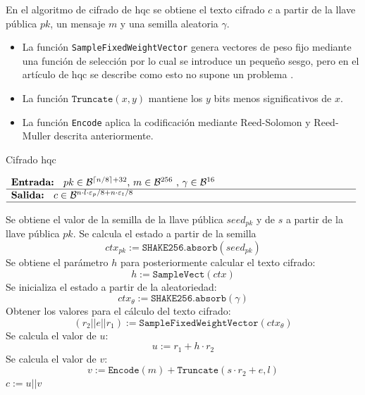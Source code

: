 En el algoritmo de cifrado de \acrshort{hqc} se obtiene el texto cifrado \(c\) a partir de la llave pública \(pk\), un mensaje \(m\) y una semilla aleatoria \(\gamma\).
\begin{itemize}
	\item La función \texttt{SampleFixedWeightVector} genera vectores de peso fijo mediante una función de selección por lo cual se introduce un pequeño sesgo, pero en el artículo de \acrshort{hqc} se describe como esto no supone un problema \cite{hqc2025}.
	\item La función $\texttt{Truncate}(x,y)$ mantiene los \(y\) bits menos significativos de \(x\).
	\item La función \texttt{Encode} aplica la codificación mediante Reed-Solomon y Reed-Muller descrita anteriormente.
\end{itemize}
\newpage
\begin{algorithm}[H]
	\small
	\caption{Cifrado \acrshort{hqc}}
	$\begin{array}{p{\textwidth}}
		\textbf{Entrada: } \(pk\in \mathcal{B}^{\lceil n/8 \rceil+32}\), \(m\in \mathcal{B}^{256}\) , \(\gamma\in \mathcal{B}^{16}\)\\ 
		\hline
		\textbf{Salida: } \(c\in \mathcal{B}^{n\cdot l\cdot \varepsilon_p/8+n\cdot \varepsilon_t/8}\)\\ 
		\hline
	\end{array}$
	\begin{algorithmic}[1]
		\State Se obtiene el valor de la semilla de la llave pública \(seed_{pk}\) y de \(s\) a partir de la llave pública \(pk\).
		\State Se calcula el estado a partir de la semilla
		\begin{equation}
			ctx_{pk}:=\texttt{SHAKE256.absorb}(seed_{pk})
		\end{equation}
		\State Se obtiene el parámetro \(h\) para posteriormente calcular el texto cifrado:
		\begin{equation}
			h:=\texttt{SampleVect}(ctx)
		\end{equation}
		\State Se inicializa el estado a partir de la aleatoriedad:
		\begin{equation}
			ctx_{\theta}:=\texttt{SHAKE256.absorb}(\gamma)
		\end{equation}
		\State Obtener los valores para el cálculo del texto cifrado:
		\begin{equation}
			(r_2||e||r_1):=\texttt{SampleFixedWeightVector}(ctx_{\theta})
		\end{equation}
		\State Se calcula el valor de \(u\):
		\begin{equation}
			u:=r_1+h\cdot r_2
		\end{equation}
		\State Se calcula el valor de \(v\): 
		\begin{equation}
			v:=\texttt{Encode}(m)+\texttt{Truncate}(s\cdot r_2+e,l)
		\end{equation}
		\State \Return $c:=u||v$
	\end{algorithmic}
\end{algorithm}


